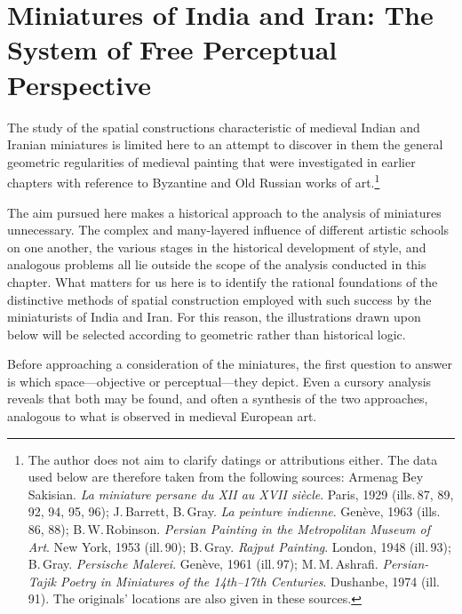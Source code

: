 
\chapter{Miniatures of India and Iran: The System of Free Perceptual Perspective}



The study of the spatial constructions characteristic of medieval Indian and Iranian
miniatures is limited here to an attempt to discover in them the general geometric
regularities of medieval painting that were investigated in earlier chapters with
reference to Byzantine and Old Russian works of
art.\footnote{The author does not aim to clarify datings or attributions either.
  The data used below are therefore taken from the following sources: Armenag Bey
  Sakisian. \emph{La miniature persane du XII au XVII si\`ecle}. Paris, 1929
  (ills.\,87, 89, 92, 94, 95, 96); J.\,Barrett, B.\,Gray. \emph{La peinture
  indienne}. Gen\`eve, 1963 (ills.\,86, 88); B.\,W.\,Robinson. \emph{Persian
  Painting in the Metropolitan Museum of Art}. New York, 1953 (ill.\,90);
  B.\,Gray. \emph{Rajput Painting}. London, 1948 (ill.\,93); B.\,Gray.
  \emph{Persische Malerei}. Gen\`eve, 1961 (ill.\,97); M.\,M.\,Ashrafi.
  \emph{Persian-Tajik Poetry in Miniatures of the 14th--17th Centuries}.
  Dushanbe, 1974 (ill.\,91). The originals' locations are also given in these
  sources.}

The aim pursued here makes a historical approach to the analysis of miniatures
unnecessary. The complex and many-layered influence of different artistic schools
on one another, the various stages in the historical development of style, and
analogous problems all lie outside the scope of the analysis conducted in this
chapter. What matters for us here is to identify the rational foundations of the
distinctive methods of spatial construction employed with such success by the
miniaturists of India and Iran. For this reason, the illustrations drawn upon below
will be selected according to geometric rather than historical logic.

Before approaching a consideration of the miniatures, the first question to answer
is which space---objective or perceptual---they depict. Even a cursory analysis
reveals that both may be found, and often a synthesis of the two approaches,
analogous to what is observed in medieval European art.

